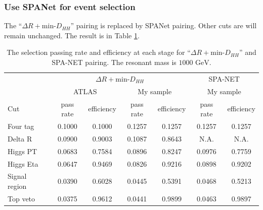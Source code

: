 \documentclass[12pt]{article}
\begin{document}
		\subsubsection{Use SPANet for event selection}%
		\label{subs:use_spanet_for_event_selection}
			The ``$\Delta R + \text{min-}D_{HH}$'' pairing is replaced by SPANet pairing. Other cuts are will remain unchanged. The result is in Table \ref{tab:signal_selection_efficiency_1000GeV_MV2c10_SPANet}.
			\begin{table}[htpb]
				\centering
				\caption{The selection passing rate and efficiency at each stage for ``$\Delta R + \text{min-}D_{HH}$'' and SPA-NET pairing. The resonant mass is $\text{1000 GeV}$.}
				\label{tab:signal_selection_efficiency_1000GeV_MV2c10_SPANet}
				\begin{tabular}{l|cc|cc|cc}
						& \multicolumn{4}{c|}{$\Delta R + \text{min-}D_{HH}$}                               & \multicolumn{2}{c}{SPA-NET}   \\
								  & \multicolumn{2}{c|}{ATLAS} & \multicolumn{2}{c|}{My sample}             & \multicolumn{2}{c}{My sample} \\
					Cut           & pass rate   & efficiency  & pass rate & \multicolumn{1}{c|}{efficiency} & pass rate     & efficiency    \\ \hline
					Four tag      & 0.1000      & 0.1000      & 0.1257    & 0.1257                          & 0.1257        & 0.1257        \\
					Delta R       & 0.0900      & 0.9003      & 0.1087    & 0.8643                          & N.A.          & N.A.          \\
					Higgs PT      & 0.0683      & 0.7584      & 0.0896    & 0.8247                          & 0.0976        & 0.7759        \\
					Higgs Eta     & 0.0647      & 0.9469      & 0.0826    & 0.9216                          & 0.0898        & 0.9202        \\
					Signal region & 0.0390      & 0.6028      & 0.0445    & 0.5391                          & 0.0468        & 0.5213        \\
					Top veto      & 0.0375      & 0.9612      & 0.0441    & 0.9899                          & 0.0463        & 0.9897   
				\end{tabular}
			\end{table}
\end{document}

